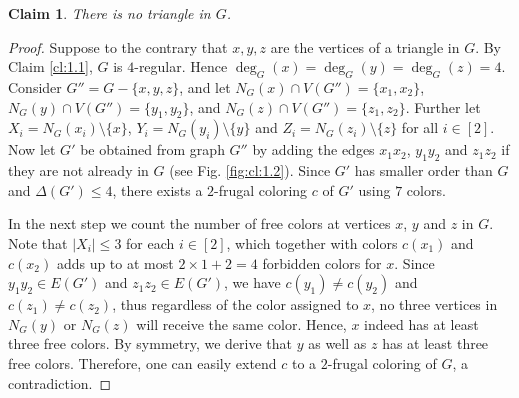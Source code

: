 \documentclass[10pt,a4paper]{article}
\newtheorem{claim}{Claim}
\begin{document}
\begin{claim} There is no triangle in $G$.
\label{cl:1.2}
\end{claim} 
\begin{proof}
Suppose to the contrary that $x,y,z$ are the vertices of a triangle in $G$. By Claim \ref{cl:1.1}, $G$ is $4$-regular. Hence $\deg_G(x)=\deg_G(y)=\deg_G(z)=4$. Consider $G''=G-\{x,y,z\}$, and let $N_G(x) \cap V(G'')=\{x_1,x_2\}$, $N_G(y) \cap V(G'')=\{y_1,y_2\}$, and $N_G(z) \cap V(G'')=\{z_1,z_2\}$. Further let $X_i=N_G(x_i)\setminus\{x\}$, $Y_i=N_G(y_i)\setminus\{y\}$ and $Z_i=N_G(z_i)\setminus\{z\}$ for all $i \in [2]$. Now let $G'$ be obtained from graph $G''$ by adding the edges $x_1x_2$, $y_1y_2$ and $z_1z_2$ if they are not already in $G$ (see Fig. \ref{fig:cl:1.2}). Since $G'$ has smaller order than $G$ and $\Delta(G')\le 4$, there exists a $2$-frugal coloring $c$ of $G'$ using $7$ colors.

In the next step we count the number of free colors at vertices $x$, $y$ and $z$ in $G$. Note that $|X_i| \le 3$ for each $i\in [2]$, which together with colors $c(x_1)$ and $c(x_2)$ adds up to at most $2 \times 1 + 2=4$ forbidden colors for $x$. Since $y_1y_2 \in E(G')$ and $z_1z_2 \in E(G')$, we have $c(y_1) \ne c(y_2)$ and $c(z_1) \ne c(z_2)$, thus regardless of the color assigned to $x$, no three vertices in $N_G(y)$ or $N_G(z)$ will receive the same color. Hence, $x$ indeed has at least three free colors. By symmetry, we derive that 
 $y$ as well as $z$ has at least three free colors. 
Therefore, one can easily extend $c$ to a $2$-frugal coloring of $G$, a contradiction. 
\end{proof}
\end{document}
